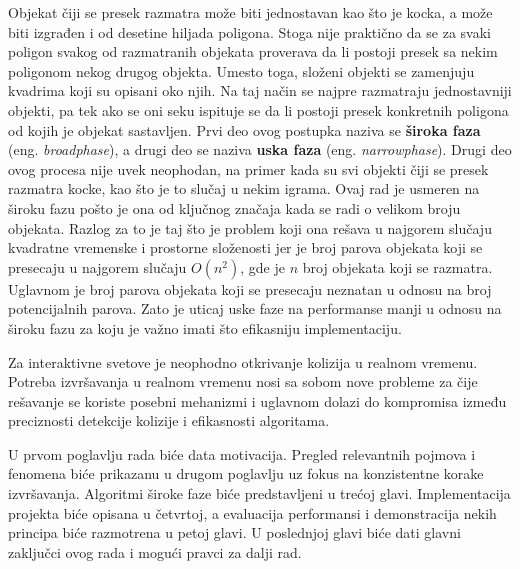 \documentclass[12pt,oneside]{memoir}
\begin{document}
Objekat čiji se presek razmatra može biti jednostavan kao što je kocka, a može biti izgrađen i od desetine hiljada poligona.
Stoga nije praktično da se za svaki poligon svakog od razmatranih objekata
proverava da li postoji presek sa nekim poligonom nekog drugog objekta.
Umesto toga, složeni objekti se zamenjuju kvadrima koji su opisani oko njih.
Na taj način se najpre razmatraju jednostavniji objekti, pa tek ako se oni seku ispituje se da li postoji presek konkretnih poligona od kojih je objekat sastavljen.
%
Prvi deo ovog postupka naziva se \textbf{široka faza} (eng. {\em broadphase}), a drugi deo se naziva \textbf{uska faza} (eng. {\em narrowphase}).
Drugi deo ovog procesa nije uvek neophodan, na primer kada su svi objekti čiji se presek razmatra kocke, kao što je to slučaj u nekim igrama.
Ovaj rad je usmeren na široku fazu pošto je ona od ključnog značaja kada se radi o velikom broju objekata.
Razlog za to je taj što je problem koji ona rešava u najgorem slučaju kvadratne vremenske i prostorne složenosti
jer je broj parova objekata koji se presecaju u najgorem slučaju $O(n^2)$, 
gde je $n$ broj objekata koji se razmatra.
Uglavnom je broj parova objekata koji se presecaju neznatan u odnosu na broj potencijalnih parova. 
Zato je uticaj uske faze na performanse manji u odnosu na široku fazu za koju je važno imati što efikasniju implementaciju.

Za interaktivne svetove je neophodno otkrivanje kolizija u realnom vremenu. 
Potreba izvršavanja u realnom vremenu nosi sa sobom nove probleme za čije rešavanje se koriste posebni mehanizmi 
i uglavnom dolazi do kompromisa između preciznosti detekcije kolizije i efikasnosti algoritama.

U prvom poglavlju rada biće data motivacija. 
Pregled relevantnih pojmova i fenomena biće prikazanu u drugom poglavlju uz fokus na konzistentne korake izvršavanja.
Algoritmi široke faze biće predstavljeni u trećoj glavi. 
Implementacija projekta biće opisana u četvrtoj, 
a evaluacija performansi i demonstracija nekih principa biće razmotrena u petoj glavi.
U poslednjoj glavi biće dati glavni zaključci ovog rada i mogući pravci za dalji rad.
\end{document}
